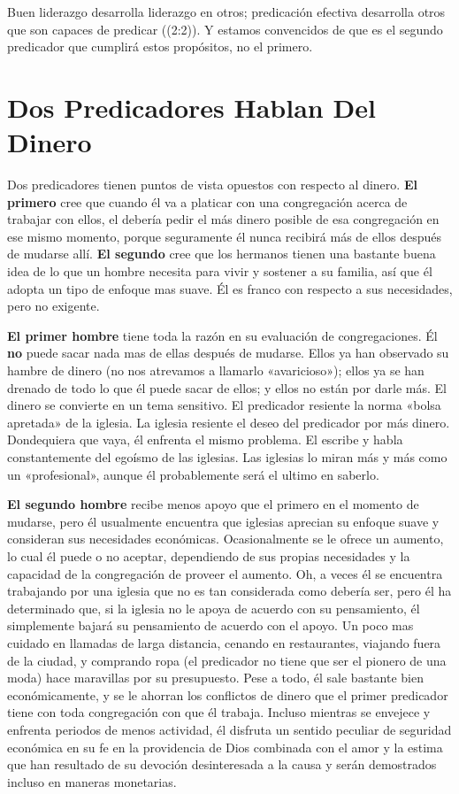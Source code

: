 \documentclass[12pt, twoside, openright]{book}
\begin{document}
Buen liderazgo desarrolla liderazgo en otros; predicación efectiva desarrolla otros que son capaces de predicar ((2:2)). Y estamos convencidos de que es el segundo predicador que cumplirá estos propósitos, no el primero. 

\section{Dos Predicadores Hablan Del Dinero}
Dos predicadores tienen puntos de vista opuestos con respecto al dinero. \textbf{El primero} cree que cuando él va a platicar con una congregación acerca de trabajar con ellos, el debería pedir el más dinero posible de esa congregación en ese mismo momento, porque seguramente él nunca recibirá más de ellos después de mudarse allí. \textbf{El segundo} cree que los hermanos tienen una bastante buena idea de lo que un hombre necesita para vivir y sostener a su familia, así que él adopta un tipo de enfoque mas suave. Él es franco con respecto a sus necesidades, pero no exigente. 

\textbf{El primer hombre} tiene toda la razón en su evaluación de congregaciones. Él \textbf{no} puede sacar nada mas de ellas después de mudarse. Ellos ya han observado su hambre de dinero (no nos atrevamos a llamarlo «avaricioso»); ellos ya se han drenado de todo lo que él puede sacar de ellos; y ellos no están por darle más. El dinero se convierte en un tema sensitivo. El predicador resiente la norma «bolsa apretada» de la iglesia. La iglesia resiente el deseo del predicador por más dinero. Dondequiera que vaya, él enfrenta el mismo problema. El escribe y habla constantemente del egoísmo de las iglesias. Las iglesias lo miran más y más como un «profesional», aunque él probablemente será el ultimo en saberlo. 

\textbf{El segundo hombre} recibe menos apoyo que el primero en el momento de mudarse, pero él usualmente encuentra que iglesias aprecian su enfoque suave y consideran sus necesidades económicas. Ocasionalmente se le ofrece un aumento, lo cual él puede o no aceptar, dependiendo de sus propias necesidades y la capacidad de la congregación de proveer el aumento. Oh, a veces él se encuentra trabajando por una iglesia que no es tan considerada como debería ser, pero él ha determinado que, si la iglesia no le apoya de acuerdo con su pensamiento, él simplemente bajará su pensamiento de acuerdo con el apoyo. Un poco mas cuidado en llamadas de larga distancia, cenando en restaurantes, viajando fuera de la ciudad, y comprando ropa (el predicador no tiene que ser el pionero de una moda) hace maravillas por su presupuesto. Pese a todo, él sale bastante bien económicamente, y se le ahorran los conflictos de dinero que el primer predicador tiene con toda congregación con que él trabaja. Incluso mientras se envejece y enfrenta periodos de menos actividad, él disfruta un sentido peculiar de seguridad económica en su fe en la providencia de Dios combinada con el amor y la estima que han resultado de su devoción desinteresada a la causa y serán demostrados incluso en maneras monetarias. 
\end{document}
